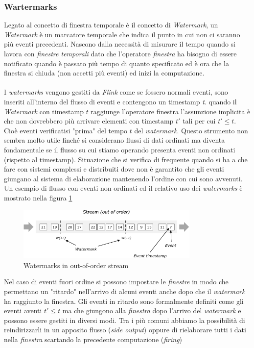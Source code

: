 \subsubsection{Wartermarks}
\label{subsubsec:flink_watermarks}
Legato al concetto di finestra temporale è il concetto di \textit{Watermark}, un \textit{Watermark} è un marcatore temporale che indica il punto in cui non ci saranno più eventi precedenti.
Nascono dalla necessità di misurare il tempo quando si lavora con \textit{finestre temporali} dato che l'operatore \textit{finestra} ha bisogno di essere notificato
quando è passato più tempo di quanto specificato ed è ora che la finestra si chiuda (non accetti più eventi) ed inizi la computazione.\\\\
I \textit{watermarks} vengono gestiti da \textit{Flink} come se fossero normali eventi, sono inseriti all'interno del flusso di eventi e contengono un timestamp \textit{t}.
quando il \textit{Watermark} con timestamp $t$ raggiunge l'operatore finestra l'assunzione implicita è che non dovrebbero più arrivare elementi con timestamp $t'$ tali per cui $t' \leq t$.
Cioè eventi verificatisi "prima" del tempo $t$ del \textit{watermark}.
Questo strumento non sembra molto utile finché si considerano flussi di dati ordinati ma diventa fondamentale se il flusso su cui stiamo operando presenta eventi
non ordinati (rispetto al timestamp).
Situazione che si verifica di frequente quando si ha a che fare con sistemi complessi e distribuiti dove non è garantito che gli eventi 
giungano al sistema di elaborazione mantenendo l'ordine con cui sono avvenuti.
Un esempio di flusso con eventi non ordinati ed il relativo uso dei \textit{watermarks} è mostrato nella figura \ref{fig:watermark}
\begin{figure}[htbp]
    \centering
    \includegraphics[width=0.8\textwidth]{images/flink/watermark_out_of_order.png}
    \caption{Watermarks in out-of-order stream}
    \label{fig:watermark}
\end{figure}
Nel caso di eventi fuori ordine si possono impostare le \textit{finestre} in modo che permettano un "ritardo" nell'arrivo di alcuni eventi anche dopo che il \textit{watermark} ha raggiunto la finestra.
Gli eventi in ritardo sono formalmente definiti come gli eventi aventi $t' \leq t$ ma che giungono alla \textit{finestra} dopo l'arrivo del \textit{watermark} e possono essere gestiti in diversi modi.
Tra i più comuni abbiamo la possibilità di reindirizzarli in un apposito flusso (\textit{side output}) oppure di rielaborare tutti i dati nella \textit{finestra} scartando la precedente computazione (\textit{firing})


